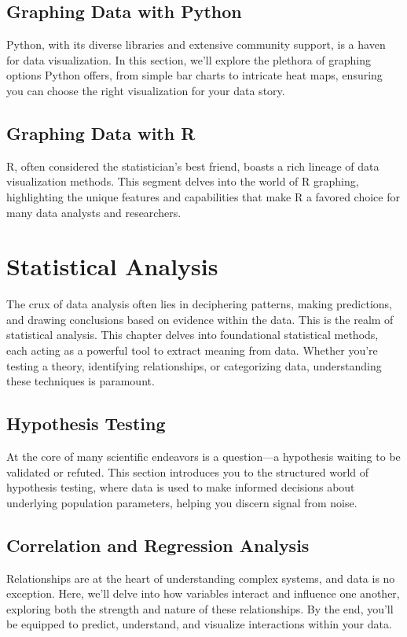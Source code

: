 \documentclass[a4paper,12pt]{book}
\begin{document}
\section{Graphing Data with Python}
Python, with its diverse libraries and extensive community support, is a haven for data visualization. In this section, we'll explore the plethora of graphing options Python offers, from simple bar charts to intricate heat maps, ensuring you can choose the right visualization for your data story.

\section{Graphing Data with R}
R, often considered the statistician's best friend, boasts a rich lineage of data visualization methods. This segment delves into the world of R graphing, highlighting the unique features and capabilities that make R a favored choice for many data analysts and researchers.

\chapter{Statistical Analysis}
The crux of data analysis often lies in deciphering patterns, making predictions, and drawing conclusions based on evidence within the data. This is the realm of statistical analysis. This chapter delves into foundational statistical methods, each acting as a powerful tool to extract meaning from data. Whether you're testing a theory, identifying relationships, or categorizing data, understanding these techniques is paramount.

\section{Hypothesis Testing}
At the core of many scientific endeavors is a question—a hypothesis waiting to be validated or refuted. This section introduces you to the structured world of hypothesis testing, where data is used to make informed decisions about underlying population parameters, helping you discern signal from noise.

\section{Correlation and Regression Analysis}
Relationships are at the heart of understanding complex systems, and data is no exception. Here, we'll delve into how variables interact and influence one another, exploring both the strength and nature of these relationships. By the end, you'll be equipped to predict, understand, and visualize interactions within your data.
\end{document}
